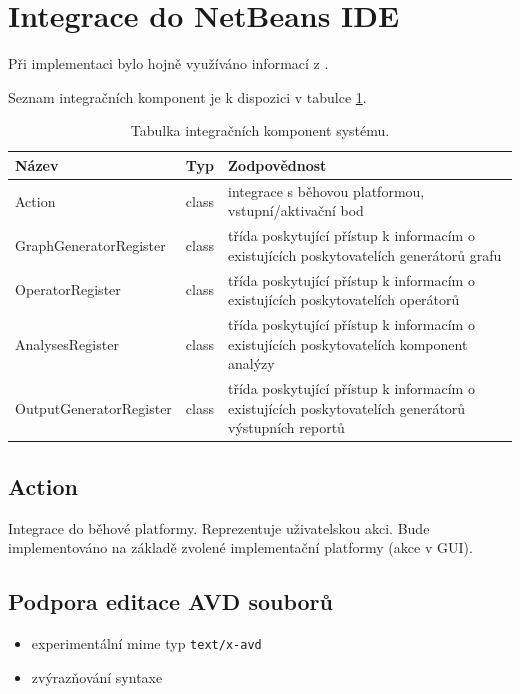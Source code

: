 \section{Integrace do NetBeans IDE}

Při implementaci bylo hojně využíváno informací z \cite{netbeans_platform}.

Seznam integračních komponent je k dispozici v tabulce \ref{implementation-integration_components}.

\begin{table}
  \caption{Tabulka integračních komponent systému. \label{implementation-integration_components}}
  \begin{center}
    \begin{tabular}{ | l | l | p{8cm} | }
      \hline
      \textbf{Název} & \textbf{Typ} & \textbf{Zodpovědnost} \\
      \hline
      \hline
      Action & class & integrace s běhovou platformou, vstupní/aktivační bod \\ \hline
      GraphGeneratorRegister & class & třída poskytující přístup k informacím o existujících poskytovatelích generátorů grafu \\ \hline
      OperatorRegister & class & třída poskytující přístup k informacím o existujících poskytovatelích operátorů \\ \hline
      AnalysesRegister & class & třída poskytující přístup k informacím o existujících poskytovatelích komponent analýzy \\ \hline
      OutputGeneratorRegister & class & třída poskytující přístup k informacím o existujících poskytovatelích generátorů výstupních reportů \\ \hline
    \end{tabular}
  \end{center}
\end{table}

\subsection{Action}
Integrace do běhové platformy. Reprezentuje uživatelskou akci. Bude implementováno na základě zvolené implementační platformy (akce v GUI).

\subsection{Podpora editace AVD souborů}
\begin{itemize}
\item experimentální mime typ \verb+text/x-avd+
\item zvýrazňování syntaxe
\end{itemize}

